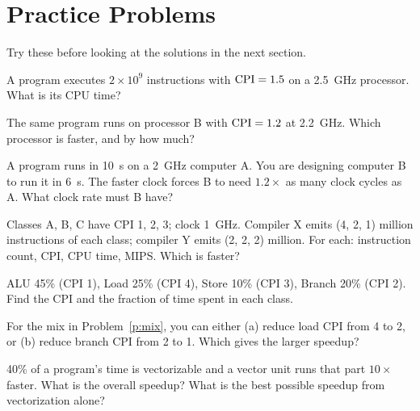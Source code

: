 \documentclass[11pt]{article}
\begin{document}
\section{Practice Problems}

Try these before looking at the solutions in the next section.

\begin{exercise}\label{p:time}
A program executes $2\times10^9$ instructions with $\mathrm{CPI}=1.5$ on a
2.5~GHz processor. What is its CPU time?
\end{exercise}

\begin{exercise}\label{p:compare}
The same program runs on processor B with $\mathrm{CPI} = 1.2$ at 2.2~GHz. Which
processor is faster, and by how much?
\end{exercise}

\begin{exercise}\label{p:clock}
A program runs in 10~s on a 2~GHz computer A. You are designing computer B to
run it in 6~s. The faster clock forces B to need $1.2\times$ as many clock
cycles as A. What clock rate must B have?
\end{exercise}

\begin{exercise}\label{p:compilers}
Classes A, B, C have CPI 1, 2, 3; clock 1~GHz. Compiler X emits (4, 2, 1)
million instructions of each class; compiler Y emits (2, 2, 2) million. For
each: instruction count, CPI, CPU time, MIPS. Which is faster?
\end{exercise}

\begin{exercise}\label{p:mix}
ALU 45\% (CPI 1), Load 25\% (CPI 4), Store 10\% (CPI 3), Branch 20\% (CPI 2).
Find the CPI and the fraction of time spent in each class.
\end{exercise}

\begin{exercise}\label{p:choose}
For the mix in Problem~\ref{p:mix}, you can either (a) reduce load CPI from 4
to 2, or (b) reduce branch CPI from 2 to 1. Which gives the larger speedup?
\end{exercise}

\begin{exercise}\label{p:vector}
40\% of a program's time is vectorizable and a vector unit runs that part
$10\times$ faster. What is the overall speedup? What is the best possible
speedup from vectorization alone?
\end{exercise}
\end{document}

